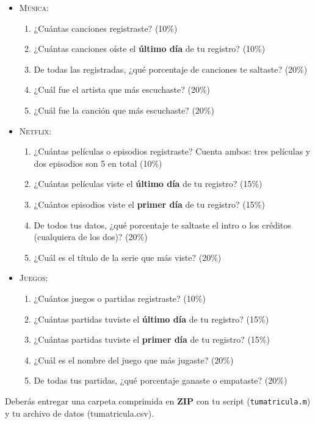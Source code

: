 \documentclass[]{book}
\theoremstyle{definition}
\begin{document}
\begin{itemize}
    \item \textsc{Música}:
    \begin{enumerate}[label=\alph*)]
        \item ¿Cuántas canciones registraste? (10\%)
        \item ¿Cuántas canciones oíste el \textbf{último día} de tu registro? (10\%)
        \item De todas las registradas, ¿qué porcentaje de canciones te saltaste? (20\%)
        \item ¿Cuál fue el artista que más escuchaste? (20\%)
        \item ¿Cuál fue la canción que más escuchaste? (20\%)
    \end{enumerate}
    \item \textsc{Netflix}: 
    \begin{enumerate}[label=\alph*)]
        \item ¿Cuántas películas o episodios registraste? Cuenta ambos: tres películas y dos episodios son 5 en total (10\%)
        \item ¿Cuántas películas viste el \textbf{último día} de tu registro? (15\%)
        \item ¿Cuántos episodios viste el \textbf{primer día} de tu registro? (15\%)
        \item De todos tus datos, ¿qué porcentaje te saltaste el intro o los créditos (cualquiera de los dos)? (20\%)
        \item ¿Cuál es el título de la serie que más viste? (20\%)
    \end{enumerate}
    \item \textsc{Juegos}:
    \begin{enumerate}[label=\alph*)]
        \item ¿Cuántos juegos o partidas registraste? (10\%)
        \item ¿Cuántas partidas tuviste el \textbf{último día} de tu registro? (15\%)
        \item ¿Cuántas partidas tuviste el \textbf{primer día} de tu registro? (15\%)
        \item ¿Cuál es el nombre del juego que más jugaste? (20\%)
        \item De todas tus partidas, ¿qué porcentaje ganaste o empataste? (20\%)
    \end{enumerate}
\end{itemize}

Deberás entregar una carpeta comprimida en \textbf{ZIP} con tu script (\texttt{tumatricula.m}) y tu archivo de datos (tumatricula.csv).
\end{document}
